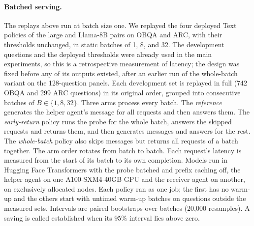 \paragraph{Batched serving.}\label{app:e2a} The replays above run at batch size one. We replayed the four deployed Text policies of the large and Llama-8B pairs on OBQA and ARC, with their thresholds unchanged, in static batches of 1, 8, and 32. The development questions and the deployed thresholds were already used in the main experiments, so this is a retrospective measurement of latency; the design was fixed before any of its outputs existed, after an earlier run of the whole-batch variant on the 128-question panels. Each development set is replayed in full (742 OBQA and 299 ARC questions) in its original order, grouped into consecutive batches of $B\in\{1,8,32\}$. Three arms process every batch. The \emph{reference} generates the helper agent's message for all requests and then answers them. The \emph{early-return} policy runs the probe for the whole batch, answers the skipped requests and returns them, and then generates messages and answers for the rest. The \emph{whole-batch} policy also skips messages but returns all requests of a batch together. The arm order rotates from batch to batch. Each request's latency is measured from the start of its batch to its own completion. Models run in Hugging Face Transformers with the probe batched and prefix caching off, the helper agent on one A100-SXM4-40GB GPU and the receiver agent on another, on exclusively allocated nodes. Each policy ran as one job; the first has no warm-up and the others start with untimed warm-up batches on questions outside the measured sets. Intervals are paired bootstraps over batches (20,000 resamples). A saving is called established when its 95\% interval lies above zero.

